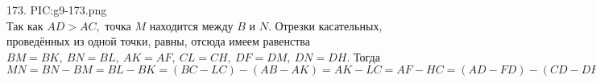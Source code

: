 173. {{PIC:g9-173.png}}\\
Так как $AD>AC,$ точка $M$ находится между $B$ и $N.$ Отрезки касательных, проведённых из одной точки, равны, отсюда имеем равенства $BM = BK,\ BN = BL,\ AK =AF,\ CL = CH,\ DF = DM,\ DN = DH.$ Тогда $MN = BN - BM = BL - BK = (BC - LC) - (AB - AK) = AK - LC =
AF - HC = (AD-FD)-(CD-DH) = DH - FD+2 = DN - DM +2 =2 -MN \Rightarrow 2MN = 2,\ MN=1.$\\
